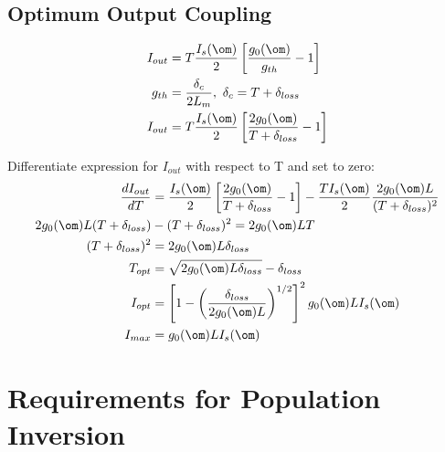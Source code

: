 \documentclass[a4paper, 11pt, normalem]{report}
\begin{document}
\section{Optimum Output Coupling}
\begin{multicols}{2}
\begin{figure}[H]
    \centering
\end{figure}
\begin{align}
    I_{out} &= T\frac{I_s(\om)}{2}\left[\frac{g_0(\om)}{g_{th}}-1\right] \\
    g_{th} &= \frac{\delta_c}{2L_m},~ \delta_c = T+\delta_{loss} \\
    I_{out} &= T\frac{I_s(\om)}{2}\left[\frac{2g_0(\om)}{T+\delta_{loss}}-1\right]
\end{align}
\end{multicols}
Differentiate expression for $I_{out}$ with respect to T and set to zero:
\begin{align}
    \frac{dI_{out}}{dT} &= \frac{I_s(\om)}{2}\left[\frac{2g_0(\om)}{T+\delta_{loss}}-1\right] - \frac{TI_s(\om)}{2}\frac{2g_0(\om)L}{(T+\delta_{loss})^2} \\
    2g_0(\om)L(T+\delta_{loss}) &- (T+\delta_{loss})^2 = 2g_0(\om)LT \\
    (T+\delta_{loss})^2 &= 2g_0(\om)L\delta_{loss} \\
    T_{opt} &= \sqrt{2g_0(\om)L\delta_{loss}} - \delta_{loss} \\
    I_{opt} &= \left[1-\left(\frac{\delta_{loss}}{2g_0(\om)L}\right)^{1/2}\right]^2 g_0(\om)LI_s(\om) \\
    I_{max} &= g_0(\om)LI_s(\om)
\end{align}

\chapter{Requirements for Population Inversion}
\end{document}
